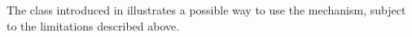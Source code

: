 The  class introduced in  illustrates a
possible way to use the \reqstop mechanism, subject to the limitations
described above.


